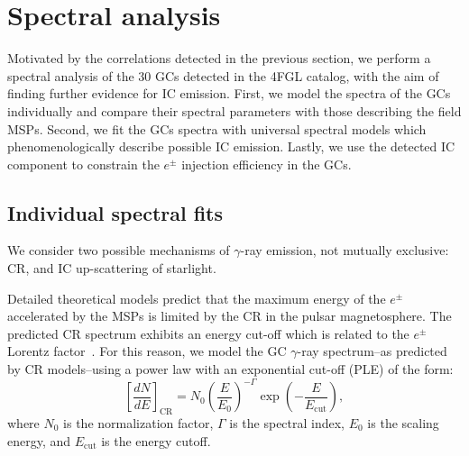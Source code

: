 \documentclass[doublespace,draft,nopageskip]{VTthesis} %
\begin{document}
\section{Spectral analysis}\label{sec:spectra}

Motivated by the correlations detected in the previous section, we perform a spectral analysis of the 30 GCs detected in the 4FGL catalog, with the aim of finding further evidence for IC emission. First, we model the spectra of the GCs individually and compare their spectral parameters with those describing the field MSPs. Second, we fit the GCs spectra with universal spectral models which phenomenologically describe possible IC emission. Lastly, we use the detected IC component to constrain the $e^\pm$ injection efficiency in the GCs.

\subsection{Individual spectral fits}\label{sec:spectra_individual}

We consider two possible mechanisms of $\gamma$-ray emission, not mutually exclusive: CR, and IC up-scattering of starlight.

Detailed theoretical models predict that the maximum energy of the $e^\pm$ accelerated by the MSPs is limited by the CR in the pulsar magnetosphere. The predicted CR spectrum exhibits an energy cut-off which is related to the $e^\pm$ Lorentz factor~\citep{2005ApJ...622..531H}. For this reason, we model the GC $\gamma$-ray spectrum--as predicted by CR models--using a power law with an exponential cut-off (PLE) of the form:
\begin{equation}\label{eq:PLE}
    \left[ \frac{dN}{dE} \right]_{\mathrm{CR}} = N_0 \left(\frac{E}{E_0} \right)^{-\Gamma}\exp{ \left( -\frac{E}{E_\text{cut}} \right) },
\end{equation}
where $N_0$ is the normalization factor, $\Gamma$ is the spectral index, $E_0$ is the scaling energy, and $E_\mathrm{cut}$ is the energy cutoff. 
\end{document}
